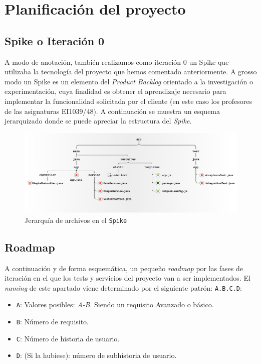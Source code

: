 \documentclass[../ei103948-project-documentation.tex]{subfiles}
\begin{document}
\section{Planificación del proyecto}
    \subsection{Spike o Iteración 0}

    A modo de anotación, también realizamos como iteración 0 un Spike que utilizaba la tecnología del proyecto que hemos comentado anteriormente. A grosso modo un Spike es un elemento del \textit{Product Backlog} orientado a la investigación o experimentación, cuya finalidad es obtener el aprendizaje necesario para implementar la funcionalidad solicitada por el cliente (en este caso los profesores de las asignaturas EI1039/48). A continuación se muestra un esquema jerarquizado donde se puede apreciar la estructura del \textit{Spike}. 

    \begin{figure}[H]
        \begin{center}
        \includegraphics[scale=0.105]{images/jerarquiaSpike.png}
        \end{center}
        \caption{Jerarquía de archivos en el \texttt{Spike}}
    \end{figure}
    \subsection{Roadmap}

        A continuación y de forma esquemática, un pequeño \textit{roadmap} por las fases de iteración en el que los tests y servicios del proyecto van a ser implementados. El \textit{naming} de este apartado viene determinado por el siguiente patrón: \texttt{A.B.C.D}:
            \begin{itemize}
                \item \texttt{A}: Valores posibles: \emph{A-B}. Siendo un requisito Avanzado o básico.
                \item \texttt{B}: Número de requisito.
                \item \texttt{C}: Número de historia de usuario.
                \item \texttt{D}: (Si la hubiese): número de subhistoria de usuario.
            \end{itemize}
\end{document}
